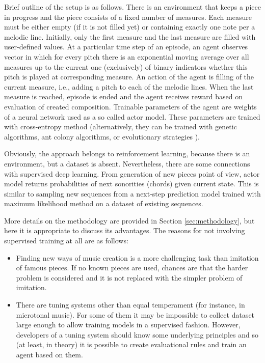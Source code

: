\documentclass{article}
\begin{document}
Brief outline of the setup is as follows. There is an environment that keeps a piece in progress and the piece consists of a fixed number of measures. Each measure must be either empty (if it is not filled yet) or containing exactly one note per a melodic line. Initially, only the first measure and the last measure are filled with user-defined values. At a particular time step of an episode, an agent observes vector in which for every pitch there is an exponential moving average over all measures up to the current one (exclusively) of binary indicators whether this pitch is played at corresponding measure. An action of the agent is filling of the current measure, i.e., adding a pitch to each of the melodic lines. When the last measure is reached, episode is ended and the agent receives reward based on evaluation of created composition. Trainable parameters of the agent are weights of a neural network used as a so called actor model. These parameters are trained with cross-entropy method \cite{rubinstein1997optimization} (alternatively, they can be trained with genetic algorithms, ant colony algorithms, or evolutionary strategies \cite{salimans2017evolution}).

Obviously, the approach belongs to reinforcement learning, because there is an environment, but a dataset is absent. Nevertheless, there are some connections with supervised deep learning. From generation of new pieces point of view, actor model returns probabilities of next sonorities (chords) given current state. This is similar to sampling new sequences from a next-step prediction model trained with maximum likelihood method on a dataset of existing sequences.

More details on the methodology are provided in Section \ref{sec:methodology}, but here it is appropriate to discuss its advantages. The reasons for not involving supervised training at all are as follows:
\begin{itemize}
	\item Finding new ways of music creation is a more challenging task than imitation of famous pieces. If no known pieces are used, chances are that the harder problem is considered and it is not replaced with the simpler problem of imitation.
	\item There are tuning systems other than equal temperament (for instance, in microtonal music). For some of them it may be impossible to collect dataset large enough to allow training models in a supervised fashion. However, developers of a tuning system should know some underlying principles and so (at least, in theory) it is possible to create evaluational rules and train an agent based on them.
\end{itemize}
\end{document}
